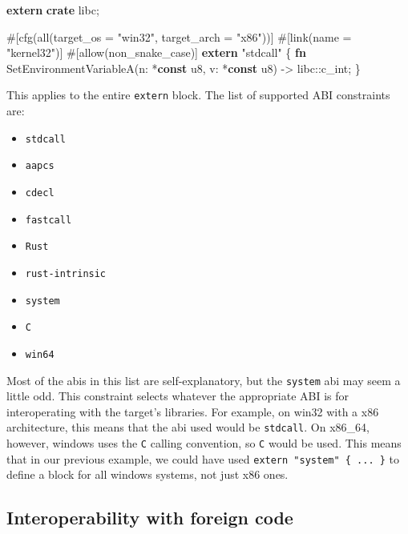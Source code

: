 \documentclass[a4paper,]{book}
\newenvironment{Shaded}{\begin{snugshade}}{\end{snugshade}}
\newcommand{\KeywordTok}[1]{\textcolor[rgb]{0.13,0.29,0.53}{\textbf{{#1}}}}
\newcommand{\DataTypeTok}[1]{\textcolor[rgb]{0.13,0.29,0.53}{{#1}}}
\newcommand{\StringTok}[1]{\textcolor[rgb]{0.31,0.60,0.02}{{#1}}}
\newcommand{\AttributeTok}[1]{\textcolor[rgb]{0.77,0.63,0.00}{{#1}}}
\newcommand{\NormalTok}[1]{{#1}}
\providecommand{\tightlist}{%
  \setlength{\itemsep}{0pt}\setlength{\parskip}{0pt}}
\begin{document}
\begin{Shaded}
\begin{Highlighting}[]
\KeywordTok{extern} \KeywordTok{crate} \NormalTok{libc;}

\AttributeTok{#[}\NormalTok{cfg}\AttributeTok{(}\NormalTok{all}\AttributeTok{(}\NormalTok{target_os }\AttributeTok{=} \StringTok{"win32"}\AttributeTok{,} \NormalTok{target_arch }\AttributeTok{=} \StringTok{"x86"}\AttributeTok{))]}
\AttributeTok{#[}\NormalTok{link}\AttributeTok{(}\NormalTok{name }\AttributeTok{=} \StringTok{"kernel32"}\AttributeTok{)]}
\AttributeTok{#[}\NormalTok{allow}\AttributeTok{(}\NormalTok{non_snake_case}\AttributeTok{)]}
\KeywordTok{extern} \StringTok{"stdcall"} \NormalTok{\{}
    \KeywordTok{fn} \NormalTok{SetEnvironmentVariableA(n: *}\KeywordTok{const} \DataTypeTok{u8}\NormalTok{, v: *}\KeywordTok{const} \DataTypeTok{u8}\NormalTok{) -> libc::}\DataTypeTok{c_int}\NormalTok{;}
\NormalTok{\}}
\end{Highlighting}
\end{Shaded}

This applies to the entire \texttt{extern} block. The list of supported
ABI constraints are:

\begin{itemize}
\tightlist
\item
  \texttt{stdcall}
\item
  \texttt{aapcs}
\item
  \texttt{cdecl}
\item
  \texttt{fastcall}
\item
  \texttt{Rust}
\item
  \texttt{rust-intrinsic}
\item
  \texttt{system}
\item
  \texttt{C}
\item
  \texttt{win64}
\end{itemize}

Most of the abis in this list are self-explanatory, but the
\texttt{system} abi may seem a little odd. This constraint selects
whatever the appropriate ABI is for interoperating with the target's
libraries. For example, on win32 with a x86 architecture, this means
that the abi used would be \texttt{stdcall}. On x86\_64, however,
windows uses the \texttt{C} calling convention, so \texttt{C} would be
used. This means that in our previous example, we could have used
\texttt{extern\ "system"\ \{\ ...\ \}} to define a block for all windows
systems, not just x86 ones.

\subsection{Interoperability with foreign
code}\label{interoperability-with-foreign-code}
\end{document}
